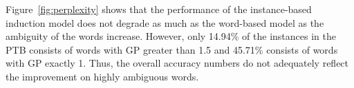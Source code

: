 Figure~\ref{fig:perplexity} shows that the performance of the
instance-based induction model does not degrade as much as the
word-based model as the ambiguity of the words increase.  However,
only 14.94\% of the instances in the PTB consists of words with GP
greater than 1.5 and 45.71\% consists of words with GP exactly 1.
Thus, the overall accuracy numbers do not adequately reflect the
improvement on highly ambiguous words.


